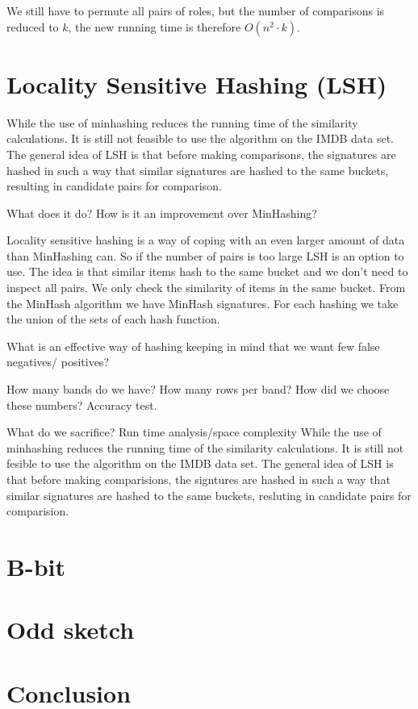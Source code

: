 \documentclass[a4paper,11pt]{article}
\begin{document}
We still have to permute all pairs of roles, but the number of comparisons is reduced to $k$, the new running time is therefore $O(n^2 \cdot k)$.

\section{Locality Sensitive Hashing (LSH)}

While the use of minhashing reduces the running time of the similarity calculations. It is still not feasible to use the algorithm on the IMDB data set. The general idea of LSH is that before making comparisons, the signatures are hashed in such a way that similar signatures are hashed to the same buckets, resulting in candidate pairs for comparison.

What does it do? How is it an improvement over MinHashing?

Locality sensitive hashing is a way of coping with an even larger amount of data than MinHashing can. So if the number of pairs is too large LSH is an option to use. The idea is that similar items hash to the same bucket and we don’t need to inspect all pairs. We only check the similarity of items in the same bucket. From the MinHash algorithm we have MinHash signatures. For each hashing we take the union of the sets of each hash function.

What is an effective way of hashing keeping in mind that we want few false negatives/
positives? 

How many bands do we have? How many rows per band? How did we choose these numbers? Accuracy test. 

What do we sacrifice?
Run time analysis/space complexity
While the use of minhashing reduces the running time of the similarity calculations. It is still not fesible to use the algorithm on the IMDB data set. The general idea of LSH is that before making comparisions, the signtures are hashed in such a way that similar signatures are hashed to the same buckets, resluting in candidate pairs for comparision.

\section{B-bit}

\section{Odd sketch}

\section{Conclusion}
\end{document}
